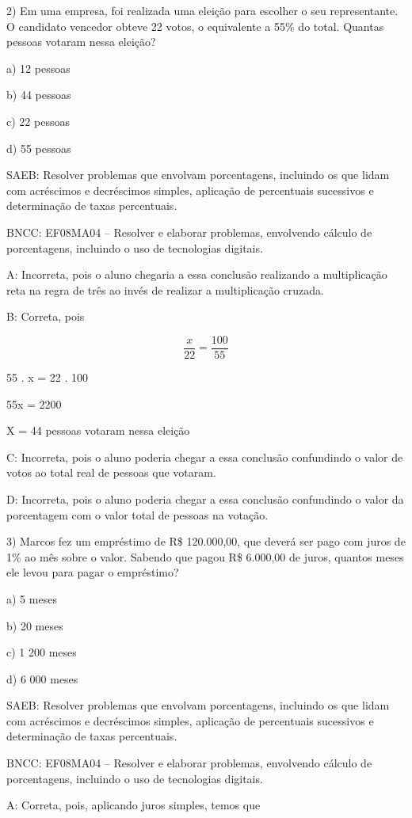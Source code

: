 2) Em uma empresa, foi realizada uma eleição para escolher o seu
representante. O candidato vencedor obteve 22 votos, o equivalente a
55\% do total. Quantas pessoas votaram nessa eleição?

a) 12 pessoas

b) 44 pessoas

c) 22 pessoas

d) 55 pessoas

SAEB: Resolver problemas que envolvam porcentagens, incluindo os que
lidam com acréscimos e decréscimos simples, aplicação de percentuais
sucessivos e determinação de taxas percentuais.

BNCC: EF08MA04 -- Resolver e elaborar problemas, envolvendo cálculo de
porcentagens, incluindo o uso de tecnologias digitais.

A: Incorreta, pois o aluno chegaria a essa conclusão realizando a
multiplicação reta na regra de três ao invés de realizar a multiplicação
cruzada.

B: Correta, pois

\[\frac {x}{22} = \frac {100}{55}\]

55 . x = 22 . 100

55x = 2200

X = 44 pessoas votaram nessa eleição

C: Incorreta, pois o aluno poderia chegar a essa conclusão confundindo o
valor de votos ao total real de pessoas que votaram.

D: Incorreta, pois o aluno poderia chegar a essa conclusão confundindo o
valor da porcentagem com o valor total de pessoas na votação.

3) Marcos fez um empréstimo de R\$ 120.000,00, que deverá ser pago com
juros de 1\% ao mês sobre o valor. Sabendo que pagou R\$ 6.000,00 de
juros, quantos meses ele levou para pagar o empréstimo?

a) 5 meses

b) 20 meses

c) 1 200 meses

d) 6 000 meses

SAEB: Resolver problemas que envolvam porcentagens, incluindo os que
lidam com acréscimos e decréscimos simples, aplicação de percentuais
sucessivos e determinação de taxas percentuais.

BNCC: EF08MA04 -- Resolver e elaborar problemas, envolvendo cálculo de
porcentagens, incluindo o uso de tecnologias digitais.

A: Correta, pois, aplicando juros simples, temos que

